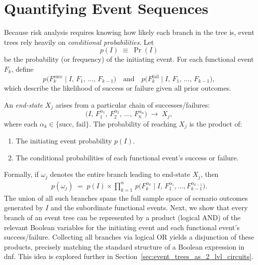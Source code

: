 \section{Quantifying Event Sequences}

Because risk analysis requires knowing how likely each branch in the tree is, event trees rely heavily on \emph{conditional probabilities}. Let
\[
    p(I)
    \;\equiv\;
    \Pr(I)
\]
be the probability (or frequency) of the initiating event. For each functional event \(F_k\), define
\[
    p\bigl(F_k^{\text{succ}}\mid I,\, F_1,\,\dots,\,F_{k-1}\bigr)
    \quad\text{and}\quad
    p\bigl(F_k^{\text{fail}}\mid I,\, F_1,\,\dots,\,F_{k-1}\bigr),
\]
which describe the likelihood of success or failure given all prior outcomes.

An \emph{end-state} \(X_j\) arises from a particular chain of successes/failures:
\[
    \bigl(I,\,F_1^{\alpha_1},\,F_2^{\alpha_2},\,\ldots,\,F_n^{\alpha_n}\bigr)
    \;\longrightarrow\; 
    X_j,
\]
where each \(\alpha_k \in \{\text{succ},\,\text{fail}\}\). The probability of reaching \(X_j\) is the product of:
\begin{enumerate}
    \item The initiating event probability \(p(I)\).
    \item The conditional probabilities of each functional event's success or failure.
\end{enumerate}
Formally, if \(\omega_j\) denotes the entire branch leading to end-state \(X_j\), then
\begin{align}
\label{eq:event_tree_branch_probability}
    p(\omega_j)
    \;=\;
    p(I)
    \times
    \prod_{k=1}^{n}\,
    p\!\bigl(F_k^{\alpha_k}\mid 
             I,\,
             F_1^{\alpha_1},\ldots,
             F_{k-1}^{\alpha_{k-1}}\bigr).
\end{align}
The union of all such branches spans the full sample space of scenario outcomes generated by \(I\) and the subordinate functional events. Next, we show that every branch of an event tree can be represented by a product (logical AND) of the relevant Boolean variables for the initiating event and each functional event’s success/failure.  Collecting all branches via logical OR yields a disjunction of these products, precisely matching the standard structure of a Boolean expression in \acrfull{dnf}. This idea is explored further in Section~\ref{sec:event_trees_as_2_lvl_circuits}.